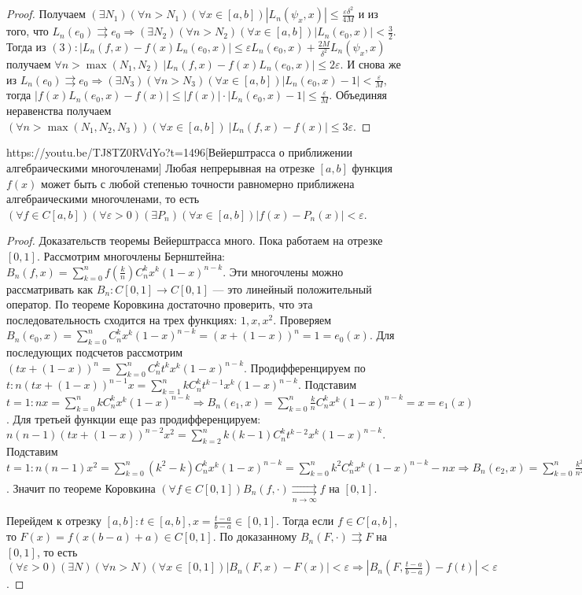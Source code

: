 \begin{proof}
Получаем $(\exists N_1)(\forall n > N_1)(\forall x\in [a,b]) |L_n(\psi_x,x)|\leqslant\frac{\varepsilon\delta^2}{4M}$ и из того, что $L_n(e_0)\rightrightarrows  e_0\Rightarrow (\exists N_2)(\forall n > N_2)(\forall x\in [a,b]) |L_n(e_0,x)|<\frac{3}{2}$. Тогда из $(3): |L_n(f,x)-f(x)L_n(e_0,x)|\leqslant\varepsilon L_n(e_0,x)+\frac{2M}{\delta^2}L_n(\psi_x,x)$ получаем $\forall n > \max(N_1, N_2)\  |L_n(f,x)-f(x)L_n(e_0, x)|\leqslant 2\varepsilon$. И снова же из $L_n(e_0)\rightrightarrows e_0\Rightarrow(\exists N_3)(\forall n>N_3)(\forall x\in [a,b]) |L_n(e_0, x)-1|<\frac{\varepsilon}{M}$, тогда $|f(x)L_n(e_0, x)-f(x)|\leqslant
|f(x)|\cdot|L_n(e_0,x)-1|\leqslant\frac{\varepsilon}{M}$. Объединяя неравенства получаем $(\forall n > \max(N_1, N_2, N_3))(\forall x\in [a,b])\ |L_n(f,x)-f(x)|\leqslant 3\varepsilon$.
\end{proof}

\begin{linkthm}{https://youtu.be/TJ8TZ0RVdYo?t=1496}[Вейерштрасса о приближении алгебраическими многочленами]
Любая непрерывная на отрезке $[a,b]$ функция $f(x)$ может быть с любой степенью точности равномерно приближена алгебраическими многочленами, то есть $(\forall f\in C[a,b])(\forall\varepsilon>0)(\exists P_n)(\forall x\in[a,b])|f(x)-P_n(x)|<\varepsilon$.
\end{linkthm}
\begin{proof}
Доказательств теоремы Вейерштрасса много. Пока работаем на отрезке $[0,1]$. Рассмотрим многочлены Бернштейна: $B_n(f,x)=\sum\limits_{k=0}^n f\left(\frac{k}{n}\right)C_n^k x^k (1-x)^{n-k}$. Эти многочлены можно рассматривать как $B_n:C[0,1]\to C[0,1]$ --- это линейный положительный оператор. По теореме Коровкина достаточно проверить, что эта последовательность сходится на трех функциях: $1, x, x^2$. Проверяем $B_n(e_0,x)=\sum\limits_{k=0}^n C_n^k x^k (1-x)^{n-k}=(x+(1-x))^n=1=e_0(x)$. Для последующих подсчетов рассмотрим $(tx+(1-x))^n=\sum\limits_{k=0}^n C_n^k t^k x^k (1-x)^{n-k}$. Продифференцируем по $t: n(tx+(1-x))^{n-1}x=\sum\limits_{k=1}^n k C_n^k t^{k-1}x^k(1-x)^{n-k}$. Подставим $t=1:nx=\sum\limits_{k=0}^n kC_n^k x^k (1-x)^{n-k}\Rightarrow B_n(e_1,x)=\sum\limits_{k=0}^n \frac{k}{n}C_n^kx^k(1-x)^{n-k}=x=e_1(x)$. Для третьей функции еще раз продифференцируем: $n(n-1)(tx+(1-x))^{n-2}x^2=\sum\limits_{k=2}^n k(k-1)C_n^kt^{k-2}x^k(1-x)^{n-k}$. Подставим $t=1:n(n-1)x^2=\sum\limits_{k=0}^n(k^2-k)C_n^kx^k(1-x)^{n-k}=\sum\limits_{k=0}^nk^2C_n^kx^k(1-x)^{n-k}-nx\Rightarrow B_n(e_2,x)=\sum\limits_{k=0}^n\frac{k^2}{n^2}C_n^kx^k(1-x)^{n-k}=\frac{n-1}{n}x^2+\frac{x}{n}\underset{n\to\infty}{\rightrightarrows}x^2=e_2(x)$. Значит по теореме Коровкина $(\forall f\in C[0,1]) B_n(f,\cdot)\underset{n\to\infty}{\rightrightarrows}f$ на $[0,1]$.

Перейдем к отрезку $[a,b]: t\in[a,b], x=\frac{t-a}{b-a}\in[0,1]$. Тогда если $f\in C[a,b]$, то $F(x)=f(x(b-a)+a)\in C[0,1]$. По доказанному $B_n(F,\cdot)\rightrightarrows F$ на $[0,1]$, то есть $(\forall\varepsilon >0)(\exists N)(\forall n>N)(\forall x\in[0,1])\left|B_n(F,x)-F(x)\right|<\varepsilon\Rightarrow \left|B_n(F,\frac{t-a}{b-a})-f(t)\right|<\varepsilon$.
\end{proof}

